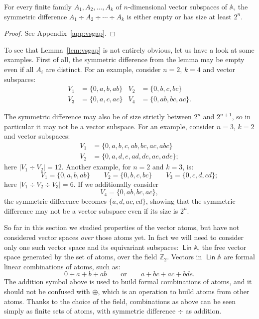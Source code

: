 \documentclass[10pt,a4paper]{amsart}
\numberwithin{equation}{section}
\newcommand{\Z}{{\mathbb Z}}
\newcommand{\xor}{\div}
\newcommand{\atoms}{\mathbb A}
\DeclareMathOperator{\lin}{\mathsf{Lin}}
\begin{document}
\begin{lemma}\label{lem:vsgap}
For every finite family $A_1,A_2,\ldots, A_k$ of $n$-dimensional vector subspaces of $\atoms$, the symmetric difference $A_1\xor A_2\xor\cdots\xor A_k$ is either empty or has size at least $2^n$.
\end{lemma}
\begin{proof}
See Appendix~\ref{app:vsgap}. 
\end{proof}

To see that Lemma~\ref{lem:vsgap} is not entirely obvious, let us have a look at some examples. First of all, the symmetric difference from the lemma may be empty even if all $A_i$ are distinct. For an example, consider $n=2$, $k=4$ and vector subspaces:
\begin{align*}
 V_1 &= \{0,a,b,ab\} & V_2 &= \{0,b,c,bc\} \\
 V_3 &= \{0,a,c,ac\} & V_4 &= \{0,ab,bc,ac\}. 
\end{align*}

The symmetric difference may also be of size strictly between $2^n$ and $2^{n+1}$, so in particular it may not be a vector subspace. For an example, consider $n=3$, $k=2$ and vector subspaces:
\begin{align*}
 V_1 &= \{0,a,b,c,ab,bc,ac,abc\} \\
 V_2 &= \{0,a,d,e,ad,de,ae,ade\};
\end{align*}
here $|V_1\xor V_2|=12$. Another example, for $n=2$ and $k=3$, is:
\[
 V_1 = \{0,a,b,ab\} \qquad V_2 = \{0,b,c,bc\} \qquad V_3 = \{0,c,d,cd\};
\]
here $|V_1\xor V_2\xor V_3|=6$. If we additionally consider
\[
 V_4 = \{0,ab,bc,ac\},
\]
the symmetric difference becomes $\{a,d,ac,cd\}$, showing that the symmetric difference may not be a vector subspace even if its size is $2^n$. 

\medskip

So far in this section we studied properties of the vector atoms, but have not considered vector spaces {\em over} those atoms yet. In fact we will need to consider only one such vector space and its equivariant subspaces: $\lin\atoms$, the free vector space generated by the set of atoms, over the field $\Z_2$. Vectors in $\lin\atoms$ are formal linear combinations of atoms, such as:
\begin{equation}\label{eq:vecvec-ex}
	0 + a + b + ab \qquad \text{or} \qquad a + bc + ac + bde.
\end{equation}
The addition symbol above is used to build formal combinations of atoms, and it should not be confused with $\oplus$, which is an operation to build atoms from other atoms. Thanks to the choice of the field, combinations as above can be seen simply as finite sets of atoms, with symmetric difference $\xor$ as addition.
\end{document}
